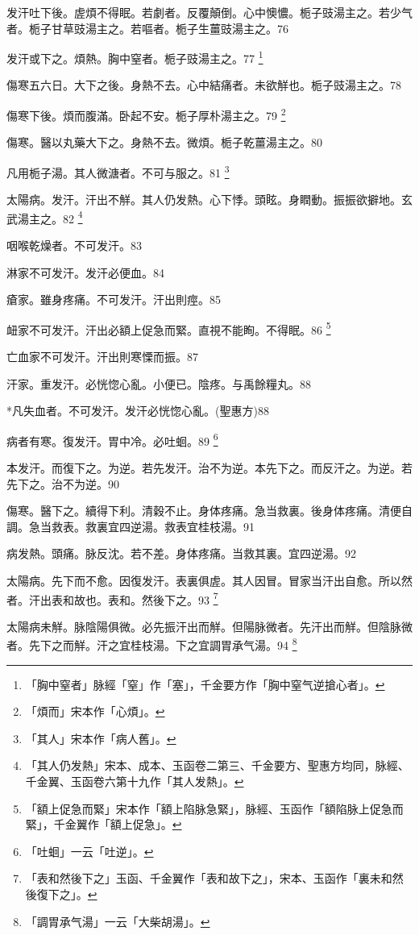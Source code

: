 \documentclass[12pt,twoside,UTF8,b5paper]{ctexbook}
\begin{document}
发汗吐下後。虗煩不得眠。若劇者。反覆顛倒。心中懊憹。栀子{豉}湯主之。若少气者。栀子甘草{豉}湯主之。若嘔者。栀子生薑{豉}湯主之。76

发汗或下之。煩熱。胸中窒者。栀子{豉}湯主之。77
	\footnote{「胸中窒者」脉經「窒」作「塞」，千金要方作「胸中窒气逆搶心者」。}

傷寒五六日。大下之後。身熱不去。心中結痛者。未欲觧也。栀子{豉}湯主之。78

傷寒下後。煩而腹滿。卧起不安。栀子厚朴湯主之。79
	\footnote{「煩而」宋本作「心煩」。}

傷寒。醫以丸藥大下之。身熱不去。微煩。栀子乾薑湯主之。80

凡用栀子湯。其人微溏者。不可与服之。81
	\footnote{「其人」宋本作「病人舊」。}

太陽病。发汗。汗出不觧。其人仍发熱。心下悸。頭眩。身瞤動。振振欲擗地。玄武湯主之。82
	\footnote{「其人仍发熱」宋本、成本、玉函卷二第三、千金要方、聖惠方均同，脉經、千金翼、玉函卷六第十九作「其人发熱」。}

咽喉乾燥者。不可发汗。83

淋家不可发汗。发汗必便血。84

瘡家。雖身疼痛。不可发汗。汗出則痙。85

衄家不可发汗。汗出必額上促急{而緊}。直視不能眴。不得眠。86
	\footnote{「額上促急而緊」宋本作「額上陷脉急緊」，脉經、玉函作「額陷脉上促急而緊」，千金翼作「額上促急」。}

亡血家不可发汗。汗出則寒慄而振。87

汗家。重发汗。必恍惚心亂。小便已。陰疼。与禹餘糧丸。88

*凡失血者。不可发汗。发汗必恍惚心亂。(聖惠方)88

病者有寒。復发汗。胃中冷。必吐蛔。89
	\footnote{「吐蛔」一云「吐逆」。}

本发汗。而復下之。为逆。若先发汗。治不为逆。本先下之。而反汗之。为逆。若先下之。治不为逆。90

傷寒。醫下之。續得下利。清穀不止。身体疼痛。急当救裏。後身体疼痛。清便自調。急当救表。救裏宜四逆湯。救表宜桂枝湯。91

病发熱。頭痛。脉反沈。若不差。身体疼痛。当救其裏。宜四逆湯。92

太陽病。先下而不愈。因復发汗。表裏俱虗。其人因冒。冒家当汗出自愈。所以然者。汗出表和故也。表和。然後下之。93
	\footnote{「表和然後下之」玉函、千金翼作「表和故下之」，宋本、玉函作「裏未和然後復下之」。}

太陽病未觧。脉陰陽俱微。必先振汗出而觧。但陽{脉}微者。先汗出而觧。但陰{脉}微者。先下之而觧。汗之宜桂枝湯。下之宜{調胃}承气湯。94
	\footnote{「調胃承气湯」一云「大柴胡湯」。}
\end{document}
